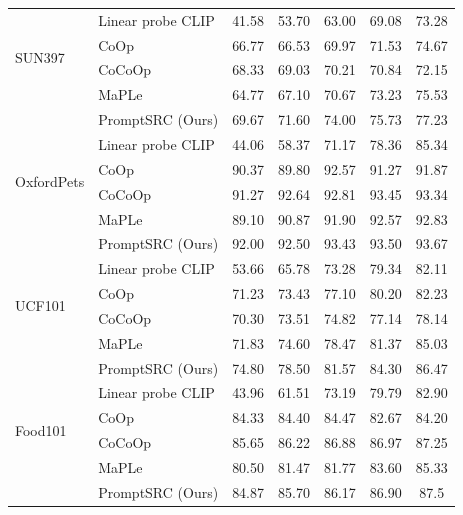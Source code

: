 \begin{table}[t!]
{\begin{tabular}{ll|ccccc}
                               \midrule
\multirow{4}{*}{SUN397}        & Linear probe CLIP          & 41.58	&53.70	&63.00	&69.08	&73.28\\
                               & CoOp                     & 66.77	&66.53	&69.97	&71.53	&74.67\\
                               & CoCoOp                   & 68.33	&69.03&	70.21	&70.84	&72.15\\
                                                              & MaPLe                  & 64.77	&67.10	&70.67&	73.23&	75.53\\
                             \rowcolor{tabhighlight}   &  PromptSRC (Ours)               &69.67	&71.60	&74.00	&75.73	&77.23\\
                               \midrule
\multirow{4}{*}{OxfordPets}    & Linear probe CLIP        & 44.06	&58.37	&71.17	&78.36	&85.34\\
                               & CoOp                      & 90.37	&89.80	&92.57	&91.27	&91.87\\
                               & CoCoOp                       & 91.27	&92.64	&92.81	&93.45	&93.34\\
                                                              & MaPLe                  & 89.10	&90.87	&91.90&	92.57& 92.83\\
                              \rowcolor{tabhighlight} &   PromptSRC (Ours)                  & 92.00	&92.50	&93.43	&93.50	&93.67\\
                               \midrule
\multirow{4}{*}{UCF101}        & Linear probe CLIP        & 53.66	&65.78	&73.28	&79.34&	82.11\\
                               & CoOp                     & 71.23	&73.43	&77.10	&80.20	&82.23\\
                               & CoCoOp                   & 70.30	&73.51	&74.82	&77.14&	78.14\\
                                                              & MaPLe                  & 71.83	&74.60	& 78.47& 81.37&	85.03\\
                             \rowcolor{tabhighlight}  &   PromptSRC (Ours)                  & 74.80	&78.50	&81.57	&84.30	&86.47\\
\midrule
\multirow{4}{*}{Food101}       & Linear probe CLIP       & 43.96	&61.51	&73.19	&79.79	&82.90\\
                               & CoOp                    & 84.33	&84.40	&84.47	&82.67	&84.20\\
                               & CoCoOp                     & 85.65	&86.22	&86.88	&86.97	&87.25\\
                                                              & MaPLe                  & 80.50 &81.47	&81.77&	83.60&	85.33\\
                              \rowcolor{tabhighlight} &   PromptSRC (Ours)               & 84.87&	85.70	&86.17	&86.90	&87.5\\


\end{tabular}}
\end{table}
